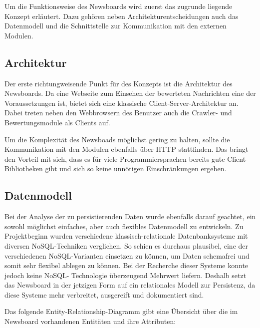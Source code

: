 Um die Funktionsweise des Newsboards wird zuerst das zugrunde liegende Konzept erläutert.
Dazu gehören neben Architekturentscheidungen auch das Datenmodell und die Schnittstelle
zur Kommunikation mit den externen Modulen.

\subsection{Architektur}
Der erste richtungweisende Punkt für des Konzepts ist die Architektur des Newsboards.
Da eine Webseite zum Einsehen der bewerteten Nachrichten eine der Voraussetzungen ist,
bietet sich eine klassische Client-Server-Architektur an.
Dabei treten neben den Webbrowsern des Benutzer auch die Crawler-
und Bewertungsmodule als Clients auf.

Um die Komplexität des Newsboads möglichst gering zu halten, sollte die Kommunikation
mit den Modulen ebenfalls über HTTP stattfinden. Das bringt den Vorteil mit sich,
dass es für viele Programmiersprachen bereits gute Client-Bibliotheken gibt
und sich so keine unnötigen Einschränkungen ergeben.

\subsection{Datenmodell}
Bei der Analyse der zu persistierenden Daten wurde ebenfalls darauf geachtet, ein
sowohl möglichst einfaches, aber auch flexibles Datenmodell zu entwickeln. Zu Projektbeginn wurden verschiedene klassisch-relationale Datenbanksysteme mit diversen 
NoSQL-Techniken verglichen. So schien es durchaus plausibel, eine der verschiedenen
NoSQL-Varianten einsetzen zu können, um Daten schemafrei und somit sehr flexibel 
ablegen zu können. Bei der Recherche dieser Systeme konnte jedoch keine NoSQL-
Technologie überzeugend Mehrwert liefern. Deshalb setzt das Newsboard in der jetzigen Form 
auf ein relationales Modell zur Persistenz, da diese Systeme mehr
verbreitet, ausgereift und dokumentiert sind.

Das folgende Entity-Relationship-Diagramm gibt eine Übersicht über die im Newsboard
vorhandenen Entitäten und ihre Attributen:

